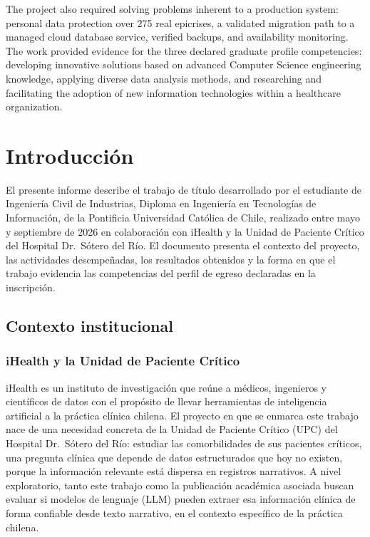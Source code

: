 \documentclass[12pt,letterpaper]{article}
\begin{document}
The project also required solving problems inherent to a production system: personal data protection over 275 real epicrises, a validated migration path to a managed cloud database service, verified backups, and availability monitoring. The work provided evidence for the three declared graduate profile competencies: developing innovative solutions based on advanced Computer Science engineering knowledge, applying diverse data analysis methods, and researching and facilitating the adoption of new information technologies within a healthcare organization.
\newpage

\section{Introducción}

El presente informe describe el trabajo de título desarrollado por el estudiante de Ingeniería Civil de Industrias, Diploma en Ingeniería en Tecnologías de Información, de la Pontificia Universidad Católica de Chile, realizado entre mayo y septiembre de 2026 en colaboración con iHealth y la Unidad de Paciente Crítico del Hospital Dr.\ Sótero del Río. El documento presenta el contexto del proyecto, las actividades desempeñadas, los resultados obtenidos y la forma en que el trabajo evidencia las competencias del perfil de egreso declaradas en la inscripción.

\subsection{Contexto institucional}

\subsubsection{iHealth y la Unidad de Paciente Crítico}

iHealth es un instituto de investigación que reúne a médicos, ingenieros y científicos de datos con el propósito de llevar herramientas de inteligencia artificial a la práctica clínica chilena. El proyecto en que se enmarca este trabajo nace de una necesidad concreta de la Unidad de Paciente Crítico (UPC) del Hospital Dr.\ Sótero del Río: estudiar las comorbilidades de sus pacientes críticos, una pregunta clínica que depende de datos estructurados que hoy no existen, porque la información relevante está dispersa en registros narrativos. A nivel exploratorio, tanto este trabajo como la publicación académica asociada buscan evaluar si modelos de lenguaje (LLM) pueden extraer esa información clínica de forma confiable desde texto narrativo, en el contexto específico de la práctica chilena.
\end{document}
